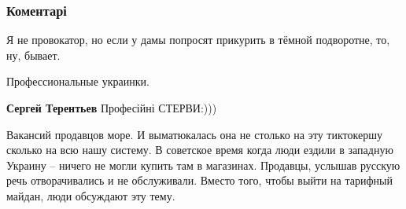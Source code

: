  
 
 
 
 
\subsubsection{Коментарі}
\label{sec:27_07_2021.fb.berdnik_miroslava.1.harkov_prodavschica_uvolnenie_jazyk.cmt}

\begin{itemize}
 
Я не провокатор, но если у дамы попросят прикурить в тёмной подворотне, то, ну, бывает.

 
Профессиональные украинки.

\begin{itemize}
 
\textbf{Сергей Терентьев}
Професійні СТЕРВИ:)))
\end{itemize}

 

Вакансий продавцов море. И выматюкалась она не столько на эту тиктокершу
сколько на всю нашу систему. В советское время когда люди ездили в западную
Украину – ничего не могли купить там в магазинах. Продавцы, услышав русскую
речь отворачивались и не обслуживали. Вместо того, чтобы выйти на тарифный
майдан, люди обсуждают эту тему.


\end{itemize}
